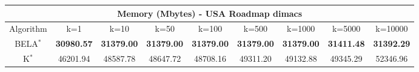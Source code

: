 \begin{tabular}{c|cccccccc}\toprule
\multicolumn{9}{c}{Memory (Mbytes) - USA Roadmap dimacs}\\ \midrule
Algorithm & k=1 & k=10 & k=50 & k=100 & k=500 & k=1000 & k=5000 & k=10000 \\ \midrule
BELA$^*$ & \textbf{30980.57} & \textbf{31379.00} & \textbf{31379.00} & \textbf{31379.00} & \textbf{31379.00} & \textbf{31379.00} & \textbf{31411.48} & \textbf{31392.29} \\
K$^*$ & 46201.94 & 48587.78 & 48647.72 & 48708.16 & 49311.20 & 49132.88 & 49345.29 & 52346.96 \\ \bottomrule 
\end{tabular}

